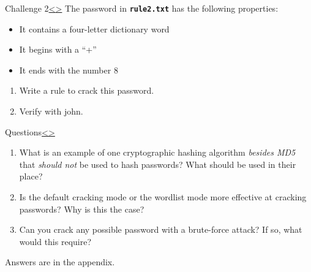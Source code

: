 \documentclass[12pt]{extarticle}
\newcommand{\code}[1]{\texttt{\bfseries#1}}
\newenvironment{instructionblock}{\Large\bgroup}{\egroup}
\begin{document}
\pagebreak
\begin{slide}{Challenge 2}{\hyperref[slide 14]{\textless}\hyperref[slide 16]{\textgreater}}
	\vskip 5pt
	\begin{instructionblock}
	The password in \code{rule2.txt} has the following properties:
		\begin{itemize}
			\item It contains a four-letter dictionary word
			\item It begins with a ``+''
			\item It ends with the number 8
		\end{itemize}
		\begin{enumerate}
			\item Write a rule to crack this password.
			\item Verify with john.
		\end{enumerate}
	\end{instructionblock}
\end{slide}
\vfill




\pagebreak
\begin{slide}{Questions}{\hyperref[slide 15]{\textless}\hyperref[slide 17]{\textgreater}}
	\vskip 10pt
	\begin{instructionblock}
		\begin{enumerate}
			\item What is an example of one cryptographic hashing algorithm \textit{besides MD5} that \textit{should not} be used to hash passwords? What should be used in their place?
			\item Is the default cracking mode or the wordlist mode more effective at cracking passwords? Why is this the case?
			\item Can you crack any possible password with a brute-force attack? If so, what would this require?
		\end{enumerate}
	\end{instructionblock}
\end{slide}

Answers are in the appendix.
\end{document}
